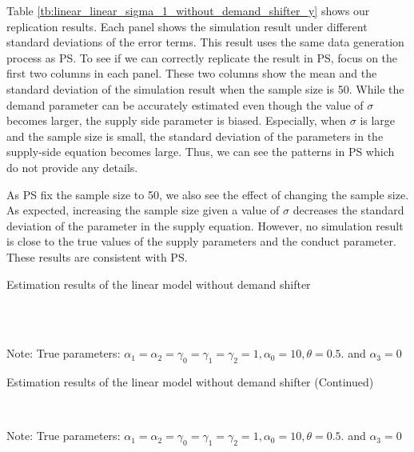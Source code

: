 \documentclass[11pt, a4paper]{article}
\begin{document}
Table \ref{tb:linear_linear_sigma_1_without_demand_shifter_y} shows our replication results.
Each panel shows the simulation result under different standard deviations of the error terms.
This result uses the same data generation process as PS. 
To see if we can correctly replicate the result in PS, focus on the first two columns in each panel.
These two columns show the mean and the standard deviation of the simulation result when the sample size is 50.
While the demand parameter can be accurately estimated even though the value of $\sigma$ becomes larger, the supply side parameter is biased.
Especially, when $\sigma$ is large and the sample size is small, the standard deviation of the parameters in the supply-side equation becomes large.
Thus, we can see the patterns in PS which do not provide any details.

As PS fix the sample size to 50, we also see the effect of changing the sample size.
As expected, increasing the sample size given a value of $\sigma$ decreases the standard deviation of the parameter in the supply equation.
However, no simulation result is close to the true values of the supply parameters and the conduct parameter.
These results are consistent with PS.

\begin{table}[!htbp]
  \begin{center}
      \caption{Estimation results of the linear model without demand shifter}
      \label{tb:linear_linear_sigma_1_without_demand_shifter_y} 
      \subfloat[$\sigma=0.001$]{}\\
      \subfloat[$\sigma=0.5$]{}\\
  \end{center}\footnotesize
  Note: True parameters: $\alpha_1 = \alpha_2 =  \gamma_0 = \gamma_1 = \gamma_2  =  1, \alpha_0 = 10, \theta = 0.5.$ and $\alpha_3 =0$
\end{table} 

\begin{table}[!htbp]
  \ContinuedFloat
  \begin{center}
      \caption{Estimation results of the linear model without demand shifter (Continued)}
      \subfloat[$\sigma=1.0$]{}\\
    \subfloat[$\sigma=2.0$]{}
  \end{center}\footnotesize
  Note: True parameters: $\alpha_1 = \alpha_2 =  \gamma_0 = \gamma_1 = \gamma_2  =  1, \alpha_0 = 10, \theta = 0.5.$ and $\alpha_3 =0$
\end{table} 
\end{document}

